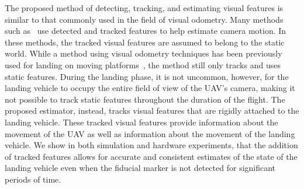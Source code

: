 The proposed method of detecting, tracking, and estimating visual features is
similar to that commonly used in the field of visual odometry. Many methods such
as~\cite{qin2018vins,leutenegger2013keyframe,mourikis2007multi,mur2015orb} use
detected and tracked features to help estimate camera motion.
In these methods, the tracked visual features are assumed to belong to the
static world. While a method using visual odometry techniques has been
previously used for landing on
moving platforms~\cite{falanga2017vision}, the method still only tracks and uses
static features.
During the landing phase, it is not uncommon, however, for the landing vehicle
to occupy the entire field of view of the UAV's camera, making it not possible
to track static features throughout the duration of the flight.
The proposed estimator, instead, tracks
visual features that are rigidly attached to the landing vehicle. These tracked
visual features provide information about the movement of the UAV as well as
information about the movement of the landing vehicle. We show in both
simulation and hardware experiments, that the addition of tracked features allows
for accurate and consistent estimates of the state of the landing vehicle even
when the fiducial marker is not detected for significant periods of time.

